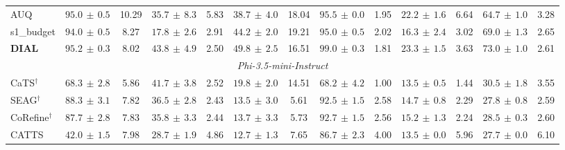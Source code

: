 \begin{table}[t]
{\begin{tabular}{l *{6}{rc} }
AUQ & \cellcolor[HTML]{E5EDF7}$95.0{\scriptscriptstyle\,\pm\,0.5}$ & 10.29 & \cellcolor[HTML]{E5EDF7}$35.7{\scriptscriptstyle\,\pm\,8.3}$ & 5.83 & $38.7{\scriptscriptstyle\,\pm\,4.0}$ & 18.04 & $95.5{\scriptscriptstyle\,\pm\,0.0}$ & 1.95 & $22.2{\scriptscriptstyle\,\pm\,1.6}$ & 6.64 & $64.7{\scriptscriptstyle\,\pm\,1.0}$ & 3.28 \\
s1\_budget & $94.0{\scriptscriptstyle\,\pm\,0.5}$ & 8.27 & $17.8{\scriptscriptstyle\,\pm\,2.6}$ & 2.91 & $44.2{\scriptscriptstyle\,\pm\,2.0}$ & 19.21 & $95.0{\scriptscriptstyle\,\pm\,0.5}$ & 2.02 & $16.3{\scriptscriptstyle\,\pm\,2.4}$ & 3.02 & \cellcolor[HTML]{E5EDF7}$69.0{\scriptscriptstyle\,\pm\,1.3}$ & 2.65 \\
\textbf{DIAL} & \cellcolor[HTML]{FBE7EB}$95.2{\scriptscriptstyle\,\pm\,0.3}$ & 8.02 & \cellcolor[HTML]{FBE7EB}$43.8{\scriptscriptstyle\,\pm\,4.9}$ & 2.50 & \cellcolor[HTML]{FBE7EB}$49.8{\scriptscriptstyle\,\pm\,2.5}$ & 16.51 & \cellcolor[HTML]{FBE7EB}$99.0{\scriptscriptstyle\,\pm\,0.3}$ & 1.81 & \cellcolor[HTML]{FBE7EB}$23.3{\scriptscriptstyle\,\pm\,1.5}$ & 3.63 & \cellcolor[HTML]{FBE7EB}$73.0{\scriptscriptstyle\,\pm\,1.0}$ & 2.61 \\
\midrule
\multicolumn{13}{c}{\textit{Phi-3.5-mini-Instruct}} \\
\midrule
CaTS$^\dagger$ & $68.3{\scriptscriptstyle\,\pm\,2.8}$ & 5.86 & $41.7{\scriptscriptstyle\,\pm\,3.8}$ & 2.52 & $19.8{\scriptscriptstyle\,\pm\,2.0}$ & 14.51 & $68.2{\scriptscriptstyle\,\pm\,4.2}$ & 1.00 & $13.5{\scriptscriptstyle\,\pm\,0.5}$ & 1.44 & $30.5{\scriptscriptstyle\,\pm\,1.8}$ & 3.55 \\
SEAG$^\dagger$ & $88.3{\scriptscriptstyle\,\pm\,3.1}$ & 7.82 & $36.5{\scriptscriptstyle\,\pm\,2.8}$ & 2.43 & $13.5{\scriptscriptstyle\,\pm\,3.0}$ & 5.61 & $92.5{\scriptscriptstyle\,\pm\,1.5}$ & 2.58 & $14.7{\scriptscriptstyle\,\pm\,0.8}$ & 2.29 & $27.8{\scriptscriptstyle\,\pm\,0.8}$ & 2.59 \\
CoRefine$^\dagger$ & $87.7{\scriptscriptstyle\,\pm\,2.8}$ & 7.83 & $35.8{\scriptscriptstyle\,\pm\,3.3}$ & 2.44 & $13.7{\scriptscriptstyle\,\pm\,3.3}$ & 5.73 & $92.7{\scriptscriptstyle\,\pm\,1.5}$ & 2.56 & \cellcolor[HTML]{E5EDF7}$15.2{\scriptscriptstyle\,\pm\,1.3}$ & 2.24 & $28.5{\scriptscriptstyle\,\pm\,0.3}$ & 2.60 \\
CATTS & $42.0{\scriptscriptstyle\,\pm\,1.5}$ & 7.98 & $28.7{\scriptscriptstyle\,\pm\,1.9}$ & 4.86 & $12.7{\scriptscriptstyle\,\pm\,1.3}$ & 7.65 & $86.7{\scriptscriptstyle\,\pm\,2.3}$ & 4.00 & $13.5{\scriptscriptstyle\,\pm\,0.0}$ & 5.96 & $27.7{\scriptscriptstyle\,\pm\,0.0}$ & 6.10 \\

\end{tabular}}
\end{table}
